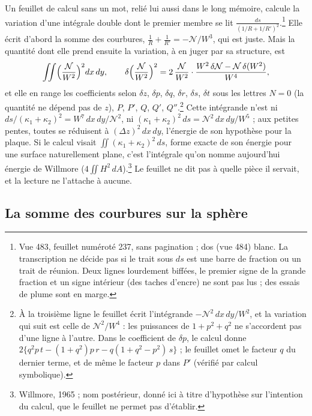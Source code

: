 \documentclass[11pt,a4paper]{article}
\begin{document}
Un feuillet de calcul sans un mot, relié lui aussi dans le long mémoire, calcule
la variation d'une intégrale double dont le premier membre se lit $\frac{ds}{(1/R
+ 1/R')^2}$.\footnote{Vue 483, feuillet numéroté 237, sans pagination ; dos (vue
484) blanc. La transcription ne décide pas si le trait sous $ds$ est une barre de
fraction ou un trait de réunion. Deux lignes lourdement biffées, le premier signe
de la grande fraction et un signe intérieur (des taches d'encre) ne sont pas lus ;
des essais de plume sont en marge.} Elle écrit d'abord la somme des courbures,
$\frac1R + \frac1{R'} = -\mathcal{N}/W^3$, qui est juste. Mais la quantité dont elle
prend ensuite la variation, à en juger par sa structure, est
\[
\iint \Bigl(\frac{\mathcal{N}}{W^2}\Bigr)^2 dx\,dy ,
\qquad
\delta\Bigl(\frac{\mathcal{N}}{W^2}\Bigr)^2 = 2\,\frac{\mathcal{N}}{W^2}\cdot
\frac{W^2\,\delta\mathcal{N} - \mathcal{N}\,\delta(W^2)}{W^4},
\]
et elle en range les coefficients selon $\delta z$, $\delta p$, $\delta q$,
$\delta r$, $\delta s$, $\delta t$ sous les lettres $N = 0$ (la quantité ne
dépend pas de $z$), $P$, $P'$, $Q$, $Q'$, $Q''$.\footnote{À la troisième ligne le
feuillet écrit l'intégrande $-\mathcal{N}^2\,dx\,dy/W^2$, et la variation qui suit
est celle de $\mathcal{N}^2/W^4$ : les puissances de $1+p^2+q^2$ ne s'accordent pas
d'une ligne à l'autre. Dans le coefficient de $\delta p$, le calcul donne
$2\{q^2p\,t - (1+q^2)p\,r - q(1+q^2-p^2)\,s\}$ ; le feuillet omet le facteur $q$
du dernier terme, et de même le facteur $p$ dans $P'$ (vérifié par calcul
symbolique).} Cette intégrande n'est ni $ds/(\kappa_1+\kappa_2)^2 = W^7\,dx\,dy
/\mathcal{N}^2$, ni $(\kappa_1+\kappa_2)^2\,ds = \mathcal{N}^2\,dx\,dy/W^5$ ; aux
petites pentes, toutes se réduisent à $(\Delta z)^2\,dx\,dy$, l'énergie de son
hypothèse pour la plaque. Si le calcul visait $\iint(\kappa_1+\kappa_2)^2\,ds$,
forme exacte de son énergie pour une surface naturellement plane, c'est
l'intégrale qu'on nomme aujourd'hui énergie de Willmore
($4\iint H^2\,dA$).\footnote{Willmore, 1965 ; nom postérieur, donné ici à titre
d'hypothèse sur l'intention du calcul, que le feuillet ne permet pas
d'établir.} Le feuillet ne dit pas à quelle pièce il servait, et la lecture ne
l'attache à aucune.

\subsection*{La somme des courbures sur la sphère}
\end{document}
